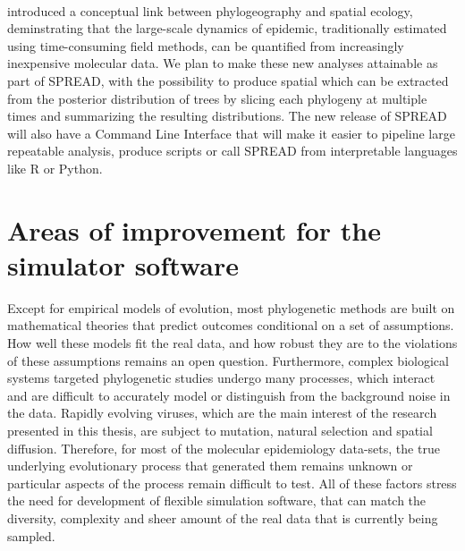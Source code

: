 \paragraph{}
\cite{Pybus2012} introduced a conceptual link between phylogeography and spatial ecology, deminstrating that the large-scale dynamics of epidemic, traditionally estimated using time-consuming field methods, can be quantified from increasingly inexpensive molecular data.
We plan to make these new analyses attainable as part of SPREAD, with the possibility to produce spatial which can be extracted  from the posterior distribution of trees by slicing each phylogeny at multiple times and summarizing the resulting distributions.
The new release of SPREAD will also have a Command Line Interface that will make it easier to pipeline large repeatable analysis, produce scripts or call SPREAD from interpretable languages like R \citep{RCran} or Python.


\section{Areas of improvement for the {\bussname} simulator software}

Except for empirical models of evolution, most phylogenetic methods are built on mathematical theories that predict outcomes conditional on a set of assumptions.
How well these models fit the real data, and how robust they are to the violations of these assumptions remains an open question.
Furthermore, complex biological systems targeted phylogenetic studies undergo many processes, which interact and are difficult to accurately model or distinguish from the background noise in the data.
Rapidly evolving viruses, which are the main interest of the research presented in this thesis, are subject to mutation, natural selection and spatial diffusion.
Therefore, for most of the molecular epidemiology data-sets, the true underlying evolutionary process that generated them remains unknown or particular aspects of the process remain difficult to test.
All of these factors stress the need for development of flexible simulation software, that can match the diversity, complexity and sheer amount of the real data that is currently being sampled.

